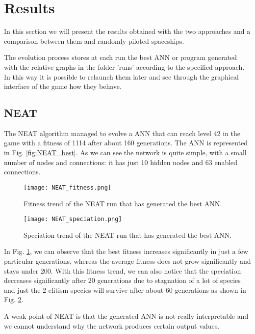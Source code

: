 
\section{Results}
In this section we will present the results obtained with the two approaches and a
comparison between them and randomly piloted spaceships.

The evolution process stores at each run the best ANN or program generated with the
relative graphs in the folder 'runs' according to the specified approach. In this way it is
possible to relaunch them later and see through the graphical interface of the game how
they behave.

\subsection{NEAT}
The NEAT algorithm managed to evolve a ANN that can reach level 42 in the game with a
fitness of 1114 after about 160 generations. The ANN is represented in Fig. \ref{fig:NEAT_best}. As we can
see the network is quite simple, with a small number of nodes and connections: it has just 10
hidden nodes and 63 enabled connections.


\begin{figure}[h!]
\centerline{\texttt{[image: NEAT\_fitness.png]}}
\caption{Fitness trend of the NEAT run that has generated the best ANN.}
\label{fig:NEAT_fitness}
\end{figure}


\begin{figure}[h!]
\centerline{\texttt{[image: NEAT\_speciation.png]}}
\caption{Speciation trend of the NEAT run that has generated the best ANN.}
\label{fig:NEAT_speciation}
\end{figure}

In Fig. \ref{fig:NEAT_fitness}, we can observe that the best fitness increases significantly in just a few particular
generations, whereas the average fitness does not grow significantly and stays under 200.
With this fitness trend, we can also notice that the speciation decreases significantly after 20
generations due to stagnation of a lot of species and just the 2 elitism species will survive
after about 60 generations as shown in Fig. \ref{fig:NEAT_speciation}.

A weak point of NEAT is that the generated ANN is not really interpretable and we cannot
understand why the network produces certain output values.


